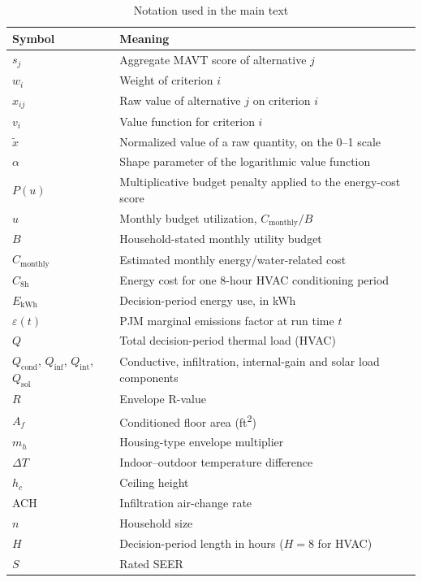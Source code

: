\documentclass[11pt]{article}
\begin{document}
\begin{table}[htbp]
\centering
\footnotesize
\caption{Notation used in the main text}
\label{tab:notation}
\renewcommand{\arraystretch}{1.1}
\begin{tabular}{@{}ll@{}}
\toprule
Symbol & Meaning \\
\midrule
$s_j$ & Aggregate MAVT score of alternative $j$ \\
$w_i$ & Weight of criterion $i$ \\
$x_{ij}$ & Raw value of alternative $j$ on criterion $i$ \\
$v_i$ & Value function for criterion $i$ \\
$\tilde{x}$ & Normalized value of a raw quantity, on the 0--1 scale \\
$\alpha$ & Shape parameter of the logarithmic value function \\
$P(u)$ & Multiplicative budget penalty applied to the energy-cost score \\
$u$ & Monthly budget utilization, $C_{\mathrm{monthly}} / B$ \\
$B$ & Household-stated monthly utility budget \\
$C_{\mathrm{monthly}}$ & Estimated monthly energy/water-related cost \\
$C_{\mathrm{8h}}$ & Energy cost for one 8-hour HVAC conditioning period \\
$E_{\mathrm{kWh}}$ & Decision-period energy use, in kWh \\
$\varepsilon(t)$ & PJM marginal emissions factor at run time $t$ \\
$Q$ & Total decision-period thermal load (HVAC) \\
$Q_{\mathrm{cond}}$, $Q_{\mathrm{inf}}$, $Q_{\mathrm{int}}$, $Q_{\mathrm{sol}}$ & Conductive, infiltration, internal-gain and solar load components \\
$R$ & Envelope R-value \\
$A_f$ & Conditioned floor area (ft\textsuperscript{2}) \\
$m_h$ & Housing-type envelope multiplier \\
$\Delta T$ & Indoor--outdoor temperature difference \\
$h_c$ & Ceiling height \\
ACH & Infiltration air-change rate \\
$n$ & Household size \\
$H$ & Decision-period length in hours ($H=8$ for HVAC) \\
$S$ & Rated SEER \\

\end{tabular}
\end{table}
\end{document}
